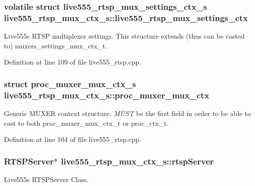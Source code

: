 \subsubsection[{\texorpdfstring{live555\+\_\+rtsp\+\_\+mux\+\_\+settings\+\_\+ctx}{live555_rtsp_mux_settings_ctx}}]{\setlength{\rightskip}{0pt plus 5cm}volatile struct {\bf live555\+\_\+rtsp\+\_\+mux\+\_\+settings\+\_\+ctx\+\_\+s} live555\+\_\+rtsp\+\_\+mux\+\_\+ctx\+\_\+s\+::live555\+\_\+rtsp\+\_\+mux\+\_\+settings\+\_\+ctx}\hypertarget{structlive555__rtsp__mux__ctx__s_a71c6838180308bfa9bf5e3c3caca682f}{}\label{structlive555__rtsp__mux__ctx__s_a71c6838180308bfa9bf5e3c3caca682f}
Live555\textquotesingle{}s R\+T\+SP multiplexer settings. This structure extends (thus can be casted to) muxers\+\_\+settings\+\_\+mux\+\_\+ctx\+\_\+t. 

Definition at line 109 of file live555\+\_\+rtsp.\+cpp.

\subsubsection[{\texorpdfstring{proc\+\_\+muxer\+\_\+mux\+\_\+ctx}{proc_muxer_mux_ctx}}]{\setlength{\rightskip}{0pt plus 5cm}struct {\bf proc\+\_\+muxer\+\_\+mux\+\_\+ctx\+\_\+s} live555\+\_\+rtsp\+\_\+mux\+\_\+ctx\+\_\+s\+::proc\+\_\+muxer\+\_\+mux\+\_\+ctx}\hypertarget{structlive555__rtsp__mux__ctx__s_ab2d3e4e814802a6f61b65465bb222a7c}{}\label{structlive555__rtsp__mux__ctx__s_ab2d3e4e814802a6f61b65465bb222a7c}
Generic M\+U\+X\+ER context structure. {\itshape M\+U\+ST} be the first field in order to be able to cast to both proc\+\_\+muxer\+\_\+mux\+\_\+ctx\+\_\+t or proc\+\_\+ctx\+\_\+t. 

Definition at line 104 of file live555\+\_\+rtsp.\+cpp.

\subsubsection[{\texorpdfstring{rtsp\+Server}{rtspServer}}]{\setlength{\rightskip}{0pt plus 5cm}R\+T\+S\+P\+Server$\ast$ live555\+\_\+rtsp\+\_\+mux\+\_\+ctx\+\_\+s\+::rtsp\+Server}\hypertarget{structlive555__rtsp__mux__ctx__s_a3c89cf1bf900f3846aee1e8a4508043d}{}\label{structlive555__rtsp__mux__ctx__s_a3c89cf1bf900f3846aee1e8a4508043d}
Live555\textquotesingle{}s R\+T\+S\+P\+Server Class. 

